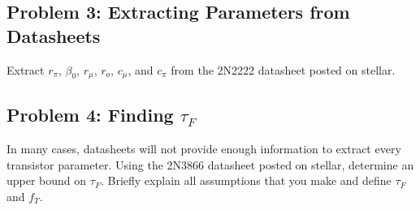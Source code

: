 \documentclass[11pt,twoside]{article}
\begin{document}
\clearpage

\subsection*{Problem 3: Extracting Parameters from Datasheets}
Extract $r_\pi$, $\beta_0$, $r_\mu$, $r_o$, $c_\mu$, and $c_\pi$ from the 2N2222 datasheet posted on stellar.

\vspace{1ex}

\subsection*{Problem 4: Finding $\tau_F$} 
In many cases, datasheets will not provide enough information to extract every transistor parameter.  
Using the 2N3866 datasheet posted on stellar, determine an upper bound on $\tau_F$.  Briefly explain all assumptions that you make and define $\tau_F$ and $f_T$.


\clearpage
\end{document}
